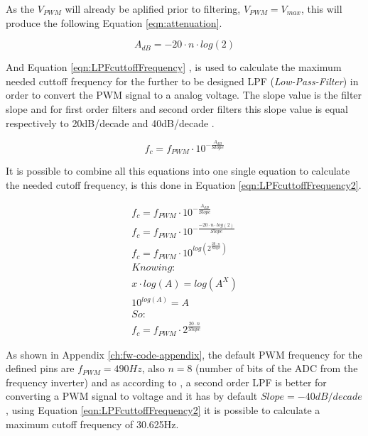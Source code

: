 		As the $V_{PWM}$ will already be aplified prior to filtering, $V_{PWM}=V_{max}$, this will produce the following Equation \ref{eqn:attenuation}.
		
			\begin{equation}\label{eqn:attenuation}
				A_{dB}=-20 \cdot n \cdot log \left( 2 \right) 
			\end{equation}
	
		And Equation \ref{eqn:LPFcuttoffFrequency} \cite{metivier2013pwm}, is used to calculate the maximum needed cuttoff frequency for the further to be designed LPF (\textit{Low-Pass-Filter}) in order to convert the PWM signal to a analog voltage. The slope value is the filter slope and for first order filters and second order filters this slope value is equal respectively to 20dB/decade and 40dB/decade \cite{metivier2013pwm}.
	
			\begin{equation}\label{eqn:LPFcuttoffFrequency}
				f_{c}=f_{PWM} \cdot 10^{-\frac{A_{dB}}{Slope}}
			\end{equation}

		It is possible to combine all this equations into one single equation to calculate the needed cutoff frequency, is this done in Equation \ref{eqn:LPFcuttoffFrequency2}.

			\begin{equation}\label{eqn:LPFcuttoffFrequency2}
				\begin{split}
					f_{c}=f_{PWM} \cdot 10^{-\frac{A_{dB}}{Slope}}	\\
					f_{c}=f_{PWM} \cdot 10^{-\frac{-20 \cdot n \cdot log \left( 2 \right)}{Slope}}	\\
					f_{c}=f_{PWM} \cdot 10^{log \left( 2^{\frac{20 \cdot n }{Slope}} \right)}	\\
					Knowing:	\\
					x \cdot log \left( A \right) =  log \left( A^{X} \right) \\
					10^{log \left( A \right) } = A	\\
					So:	\\
					f_{c}=f_{PWM} \cdot  2^{\frac{20 \cdot n}{Slope}}
				\end{split}
			\end{equation}

	
		As shown in Appendix \ref{ch:fw-code-appendix}, the default PWM frequency for the defined pins are $f_{PWM}=490Hz$, also $n=8$ (number of bits of the ADC from the frequency inverter) and as according to \cite{metivier2013pwm}, a second order LPF is better for converting a PWM signal to voltage and it has by default $Slope=-40dB/decade$, using Equation \ref{eqn:LPFcuttoffFrequency2} it is possible to calculate a maximum cutoff frequency of 30.625Hz. 

